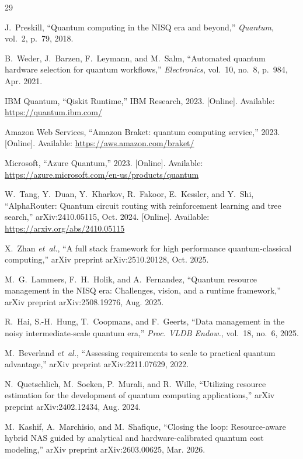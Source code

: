\documentclass[10pt,conference]{IEEEtran}
\begin{document}
\begin{thebibliography}{29}

J.~Preskill, ``Quantum computing in the NISQ era and beyond,'' \emph{Quantum}, vol.~2, p.~79, 2018.

B.~Weder, J.~Barzen, F.~Leymann, and M.~Salm, ``Automated quantum hardware selection for quantum workflows,'' \emph{Electronics}, vol.~10, no.~8, p.~984, Apr. 2021.

IBM Quantum, ``Qiskit Runtime,'' IBM Research, 2023. [Online]. Available: \url{https://quantum.ibm.com/}

Amazon Web Services, ``Amazon Braket: quantum computing service,'' 2023. [Online]. Available: \url{https://aws.amazon.com/braket/}

Microsoft, ``Azure Quantum,'' 2023. [Online]. Available: \url{https://azure.microsoft.com/en-us/products/quantum}

W.~Tang, Y.~Duan, Y.~Kharkov, R.~Fakoor, E.~Kessler, and Y.~Shi, ``AlphaRouter: Quantum circuit routing with reinforcement learning and tree search,'' arXiv:2410.05115, Oct. 2024. [Online]. Available: \url{https://arxiv.org/abs/2410.05115}

X.~Zhan \emph{et~al.}, ``A full stack framework for high performance quantum-classical computing,'' arXiv preprint arXiv:2510.20128, Oct. 2025.

M.~G.~Lammers, F.~H.~Holik, and A.~Fernandez, ``Quantum resource management in the NISQ era: Challenges, vision, and a runtime framework,'' arXiv preprint arXiv:2508.19276, Aug. 2025.

R.~Hai, S.-H.~Hung, T.~Coopmans, and F.~Geerts, ``Data management in the noisy intermediate-scale quantum era,'' \emph{Proc. VLDB Endow.}, vol.~18, no.~6, 2025.

M.~Beverland \emph{et~al.}, ``Assessing requirements to scale to practical quantum advantage,'' arXiv preprint arXiv:2211.07629, 2022.

N.~Quetschlich, M.~Soeken, P.~Murali, and R.~Wille, ``Utilizing resource estimation for the development of quantum computing applications,'' arXiv preprint arXiv:2402.12434, Aug. 2024.

M.~Kashif, A.~Marchisio, and M.~Shafique, ``Closing the loop: Resource-aware hybrid NAS guided by analytical and hardware-calibrated quantum cost modeling,'' arXiv preprint arXiv:2603.00625, Mar. 2026.


\end{thebibliography}
\end{document}
